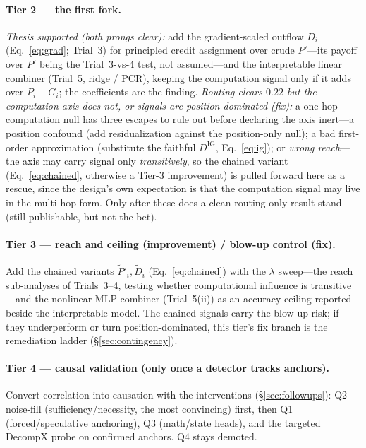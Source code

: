 \documentclass[11pt]{article}
\begin{document}
\paragraph{Tier 2 --- the first fork.}
\emph{Thesis supported (both prongs clear):} add the gradient-scaled outflow $D_i$ (Eq.~\ref{eq:grad};
Trial~3) for principled credit assignment over crude $P'$---its payoff over $P'$ being the
Trial~3-vs-4 test, not assumed---and the interpretable linear combiner (Trial~5, ridge / PCR), keeping
the computation signal only if it adds over $P_i{+}G_i$; the coefficients are the finding.
\emph{Routing clears $0.22$ but the computation axis does not, or signals are position-dominated (fix):}
a one-hop computation null has three escapes to rule out before declaring the axis inert---a position
confound (add residualization against the position-only null); a bad first-order approximation
(substitute the faithful $D^{\mathrm{IG}}$, Eq.~\ref{eq:ig}); or \emph{wrong reach}---the axis may carry
signal only \emph{transitively}, so the chained variant (Eq.~\ref{eq:chained}, otherwise a Tier-3
improvement) is pulled forward here as a rescue, since the design's own expectation is that the
computation signal may live in the multi-hop form. Only after these does a clean routing-only result
stand (still publishable, but not the bet).

\paragraph{Tier 3 --- reach and ceiling (improvement) / blow-up control (fix).}
Add the chained variants $\widetilde P'_i,\widetilde D_i$ (Eq.~\ref{eq:chained}) with the $\lambda$
sweep---the reach sub-analyses of Trials~3--4, testing whether computational influence is
transitive---and the nonlinear MLP combiner (Trial~5(ii)) as an accuracy ceiling reported beside the
interpretable model. The chained signals carry the blow-up risk; if they underperform or turn
position-dominated, this tier's fix branch is the remediation ladder (\S\ref{sec:contingency}).

\paragraph{Tier 4 --- causal validation (only once a detector tracks anchors).}
Convert correlation into causation with the interventions (\S\ref{sec:followups}): Q2 noise-fill
(sufficiency/necessity, the most convincing) first, then Q1 (forced/speculative anchoring), Q3
(math/state heads), and the targeted DecompX probe on confirmed anchors. Q4 stays demoted.
\end{document}
